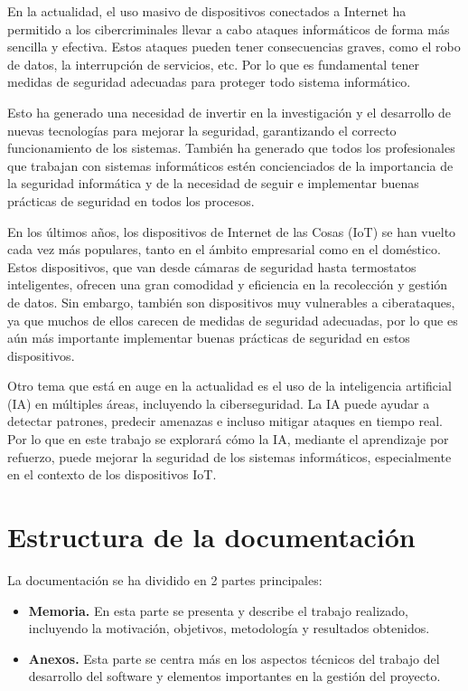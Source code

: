 
En la actualidad, el uso masivo de dispositivos conectados a Internet ha permitido a los cibercriminales llevar a cabo ataques informáticos de forma más sencilla y efectiva. Estos ataques pueden tener consecuencias graves, como el robo de datos, la interrupción de servicios, etc. Por lo que es fundamental tener medidas de seguridad adecuadas para proteger todo sistema informático.

Esto ha generado una necesidad de invertir en la investigación y el desarrollo de nuevas tecnologías para mejorar la seguridad, garantizando el correcto funcionamiento de los sistemas. También ha generado que todos los profesionales que trabajan con sistemas informáticos estén concienciados de la importancia de la seguridad informática y de la necesidad de seguir e implementar buenas prácticas de seguridad en todos los procesos.

En los últimos años, los dispositivos de Internet de las Cosas (IoT) se han vuelto cada vez más populares, tanto en el ámbito empresarial como en el doméstico. Estos dispositivos, que van desde cámaras de seguridad hasta termostatos inteligentes, ofrecen una gran comodidad y eficiencia en la recolección y gestión de datos. Sin embargo, también son dispositivos muy vulnerables a ciberataques, ya que muchos de ellos carecen de medidas de seguridad adecuadas, por lo que es aún más importante implementar buenas prácticas de seguridad en estos dispositivos.

Otro tema que está en auge en la actualidad es el uso de la inteligencia artificial (IA) en múltiples áreas, incluyendo la ciberseguridad. La IA puede ayudar a detectar patrones, predecir amenazas e incluso mitigar ataques en tiempo real. 
Por lo que en este trabajo se explorará cómo la IA, mediante el aprendizaje por refuerzo, puede mejorar la seguridad de los sistemas informáticos, especialmente en el contexto de los dispositivos IoT.

\section{Estructura de la documentación}
La documentación se ha dividido en 2 partes principales:
\begin{itemize}
    \item \textbf{Memoria.} En esta parte se presenta y describe el trabajo realizado, incluyendo la motivación, objetivos, metodología y resultados obtenidos.
    \item \textbf{Anexos.} Esta parte se centra más en los aspectos técnicos del trabajo del desarrollo del software y elementos importantes en la gestión del proyecto.
\end{itemize}

